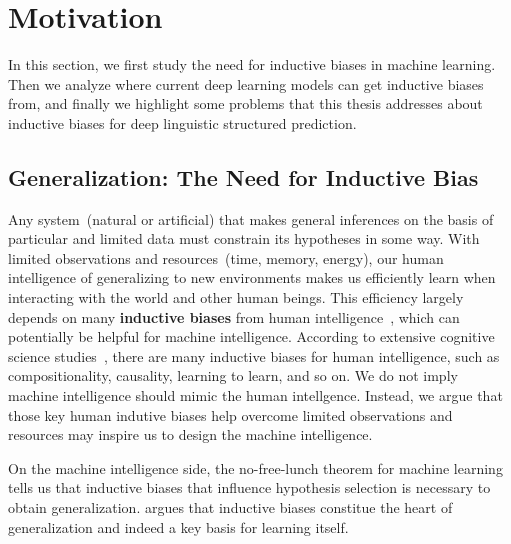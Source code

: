 \section{Motivation}
\label{sec:intro:motivation}

In this section, we first study the need for inductive biases in
machine learning. Then we analyze where current deep learning models
can get inductive biases from, and finally we highlight some problems
that this thesis addresses about inductive biases for deep linguistic
structured prediction.

\subsection{Generalization: The Need for Inductive Bias}
\label{ssec:intro:need-of-bias}

Any system~(natural or artificial) that makes general inferences on
the basis of particular and limited data must constrain its hypotheses
in some way. With limited observations and resources~(time, memory,
energy), our human intelligence of generalizing to new environments
makes us efficiently learn when interacting with the world and other
human beings. This efficiency largely depends on many {\bf inductive
  biases} from human intelligence~\citep{Gershman2021WhatMU}, which
can potentially be helpful for machine intelligence. According to
extensive cognitive science
studies~\citep{Spelke1990PrinciplesOO,Bienenstock1996CompositionalityMP,Rehder2003ACT,harlow1949formation,
  Lake2016BuildingMT,Gershman2021WhatMU}, there are many inductive
biases for human intelligence, such as compositionality, causality,
learning to learn, and so on. We do not imply machine intelligence
should mimic the human intellgence. Instead, we argue that those key
human indutive biases help overcome limited observations and resources
may inspire us to design the machine intelligence.

On the machine intelligence side, the no-free-lunch theorem for
machine learning~\citep{baxter2000model,wolpert1995no} tells us that
inductive biases that influence hypothesis selection is necessary to
obtain generalization. \citet{mitchell1980need} argues that inductive
biases constitue the heart of generalization and indeed a key basis
for learning itself.

